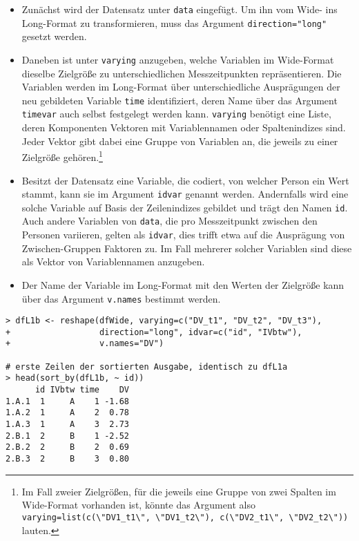 \begin{itemize}
\item Zunächst wird der Datensatz unter \lstinline!data! eingefügt. Um ihn vom Wide- ins Long-Format zu transformieren, muss das Argument \lstinline!direction="long"! gesetzt werden.
\item Daneben ist unter \lstinline!varying! anzugeben, welche Variablen im Wide-Format dieselbe Zielgröße zu unterschiedlichen Messzeitpunkten repräsentieren. Die Variablen werden im Long-Format über unterschiedliche Ausprägungen der neu gebildeten Variable \lstinline!time! identifiziert, deren Name über das Argument \lstinline!timevar! auch selbst festgelegt werden kann. \lstinline!varying! benötigt eine Liste, deren Komponenten Vektoren mit Variablennamen oder Spaltenindizes sind. Jeder Vektor gibt dabei eine Gruppe von Variablen an, die jeweils zu einer Zielgröße gehören.\footnote{Im Fall zweier Zielgrößen, für die jeweils eine Gruppe von zwei Spalten im Wide-Format vorhanden ist, könnte das Argument also \lstinline!varying=list(c(\"DV1_t1\", \"DV1_t2\"), c(\"DV2_t1\", \"DV2_t2\"))! lauten.}
\item Besitzt der Datensatz eine Variable, die codiert, von welcher Person ein Wert stammt, kann sie im Argument \lstinline!idvar! genannt werden. Andernfalls wird eine solche Variable auf Basis der Zeilenindizes gebildet und trägt den Namen \lstinline!id!. Auch andere Variablen von \lstinline!data!, die pro Messzeitpunkt zwischen den Personen variieren, gelten als \lstinline!idvar!, dies trifft etwa auf die Ausprägung von Zwischen-Gruppen Faktoren zu. Im Fall mehrerer solcher Variablen sind diese als Vektor von Variablennamen anzugeben.
\item Der Name der Variable im Long-Format mit den Werten der Zielgröße kann über das Argument \lstinline!v.names! bestimmt werden.
\end{itemize}

\begin{lstlisting}
> dfL1b <- reshape(dfWide, varying=c("DV_t1", "DV_t2", "DV_t3"),
+                  direction="long", idvar=c("id", "IVbtw"),
+                  v.names="DV")

# erste Zeilen der sortierten Ausgabe, identisch zu dfL1a
> head(sort_by(dfL1b, ~ id))
      id IVbtw time    DV
1.A.1  1     A    1 -1.68
1.A.2  1     A    2  0.78
1.A.3  1     A    3  2.73
2.B.1  2     B    1 -2.52
2.B.2  2     B    2  0.69
2.B.3  2     B    3  0.80
\end{lstlisting}


